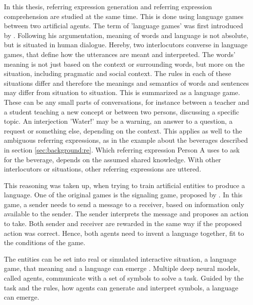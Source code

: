 In this thesis, referring expression generation and referring expression comprehension are studied at the same time.
This is done using language games between two artificial agents.
The term of 'language games' was first introduced by \citet{Wittgenstein1953}.
Following his argumentation, meaning of words and language is not absolute, but is situated in human dialogue.
Hereby, two interlocutors converse in language games, that define how the utterances are meant and interpreted.
The words' meaning is not just based on the context or surrounding words, but more on the situation, including pragmatic and social context.
The rules in each of these situations differ and therefore the meanings and semantics of words and sentences may differ from situation to situation.
This is summarized as a language game.
These can be any small parts of conversations, for instance between a teacher and a student teaching a new concept or between two persons, discussing a specific topic.
An interjection 'Water!' may be a warning, an answer to a question, a request or something else, depending on the context.
This applies as well to the ambiguous referring expressions, as in the example about the beverages described in section \ref{sec:background:re}.
Which referring expression Person A uses to ask for the beverage, depends on the assumed shared knowledge.
With other interlocutors or situations, other referring expressions are uttered.

This reasoning was taken up, when trying to train artificial entities to produce a language.
One of the original games is the signaling game, proposed by \citet{Lewis1969}.
In this game, a sender needs to send a message to a receiver, based on information only available to the sender.
The sender interprets the message and proposes an action to take.
Both sender and receiver are rewarded in the same way if the proposed action was correct.
Hence, both agents need to invent a language together, fit to the conditions of the game.

The entities can be set into real or simulated interactive situation, a language game, that meaning and a language can emerge \citep{Kirby2002}.
Multiple deep neural models, called agents, communicate with a set of symbols to solve a task.
Guided by the task and the rules, how agents can generate and interpret symbols, a language can emerge.



